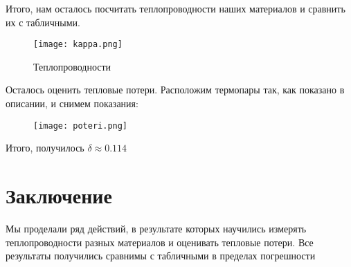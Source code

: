 \documentclass[a4paper, 12pt]{article}
\begin{document}
Итого, нам осталось посчитать теплопроводности наших материалов и сравнить их с табличными.

\begin{figure}[H]
    \centering
    \texttt{[image: kappa.png]}
    \caption{Теплопроводности}
\end{figure}

Осталось оценить тепловые потери. Расположим термопары так, как показано в описании, и снимем показания:

\begin{figure}[H]
    \centering
    \texttt{[image: poteri.png]}
\end{figure}

Итого, получилось \(\delta \approx 0.114\)

\section {Заключение}
Мы проделали ряд действий, в результате которых научились измерять теплопроводности разных материалов и оценивать тепловые потери. Все результаты получились сравнимы с табличными в пределах погрешности        
\end{document}
